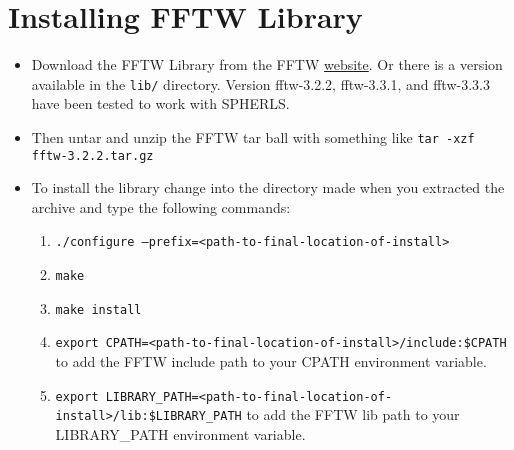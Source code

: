 \documentclass[12pt,a4paper]{book}
\begin{document}
\section{Installing FFTW Library}
\begin{itemize}
\item Download the FFTW Library from the FFTW \href{http://www.fftw.org/download.html}{website}. Or there is a version available in the {\tt lib/} directory. Version fftw-3.2.2, fftw-3.3.1, and fftw-3.3.3 have been tested to work with SPHERLS.
\item Then untar and unzip the FFTW tar ball with something like {\tt tar -xzf fftw-3.2.2.tar.gz}
\item To install the library change into the directory made when you extracted the archive and type the following commands:
\begin{enumerate}
\item {\tt ./configure --prefix\-=<path-to-final-location-of-install>}
\item {\tt make}
\item {\tt make install}
\item {\tt export CPATH=<path-to-final-location-of-install>/include:\$CPATH} to add the FFTW include path to your CPATH environment variable.
\item {\tt export LIBRARY\_PATH=<path-to-final-location-of-install>/lib:\$LIBRARY\_PATH} to add the FFTW lib path to your LIBRARY\_PATH environment variable.
\end{enumerate}
\end{itemize}
\end{document}
